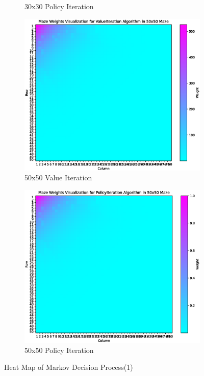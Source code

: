 \documentclass{article}
\begin{document}
\begin{figure}[hp]
\begin{subfigure}[b]{0.48\textwidth}
        \caption{30x30 Policy Iteration}
    \end{subfigure}
    \newline
    \begin{subfigure}[b]{0.48\textwidth}
        \centering
        \includegraphics[width=\textwidth]{imgs/ValueIteration-50-50.eps}
        \caption{50x50 Value Iteration}
    \end{subfigure}
    \begin{subfigure}[b]{0.48\textwidth}
        \centering
        \includegraphics[width=\textwidth]{imgs/PolicyIteration-50-50.eps}
        \caption{50x50 Policy Iteration}
    \end{subfigure}
    \newline
    \caption{Heat Map of Markov Decision Process(1)}
\end{figure}
\end{document}
